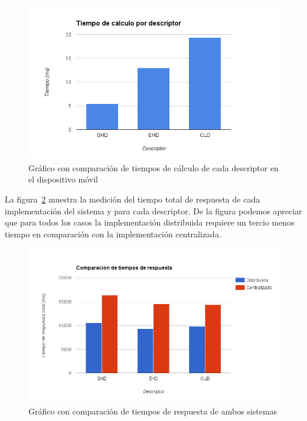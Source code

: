 \begin{figure}[!h]
		\centering
		\includegraphics[width=\textwidth]{imagenes/cap5/resultados_tiempo_descriptor.png}
		\caption{Gráfico con comparación de tiempos de cálculo de cada descriptor en el dispositivo móvil}
		\label{resultados_tiempo_descriptor}
	\end{figure}

La figura~\ref{resultados_tiempos_total} muestra la medición del tiempo total de respuesta de cada implementación del sistema y para cada descriptor. De la figura podemos apreciar que para todos los casos la implementación distribuida requiere un tercio menos tiempo en comparación con la implementación centralizada. 

	\begin{figure}[!h]
		\centering
		\includegraphics[width=\textwidth]{imagenes/cap5/resultados_tiempos_total.png}
		\caption{Gráfico con comparación de tiempos de respuesta de ambos sistemas}
		\label{resultados_tiempos_total}
	\end{figure}

